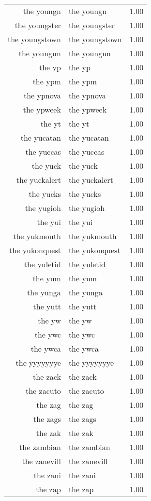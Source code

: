 \begin{table}[ht]
\begin{tabular}{rlr}
  the youngn & the youngn & 1.00 \\ 
  the youngster & the youngster & 1.00 \\ 
  the youngstown & the youngstown & 1.00 \\ 
  the youngun & the youngun & 1.00 \\ 
  the yp & the yp & 1.00 \\ 
  the ypm & the ypm & 1.00 \\ 
  the ypnova & the ypnova & 1.00 \\ 
  the ypweek & the ypweek & 1.00 \\ 
  the yt & the yt & 1.00 \\ 
  the yucatan & the yucatan & 1.00 \\ 
  the yuccas & the yuccas & 1.00 \\ 
  the yuck & the yuck & 1.00 \\ 
  the yuckalert & the yuckalert & 1.00 \\ 
  the yucks & the yucks & 1.00 \\ 
  the yugioh & the yugioh & 1.00 \\ 
  the yui & the yui & 1.00 \\ 
  the yukmouth & the yukmouth & 1.00 \\ 
  the yukonquest & the yukonquest & 1.00 \\ 
  the yuletid & the yuletid & 1.00 \\ 
  the yum & the yum & 1.00 \\ 
  the yunga & the yunga & 1.00 \\ 
  the yutt & the yutt & 1.00 \\ 
  the yw & the yw & 1.00 \\ 
  the ywc & the ywc & 1.00 \\ 
  the ywca & the ywca & 1.00 \\ 
  the yyyyyyye & the yyyyyyye & 1.00 \\ 
  the zack & the zack & 1.00 \\ 
  the zacuto & the zacuto & 1.00 \\ 
  the zag & the zag & 1.00 \\ 
  the zags & the zags & 1.00 \\ 
  the zak & the zak & 1.00 \\ 
  the zambian & the zambian & 1.00 \\ 
  the zanevill & the zanevill & 1.00 \\ 
  the zani & the zani & 1.00 \\ 
  the zap & the zap & 1.00 \\ 

\end{tabular}
\end{table}
